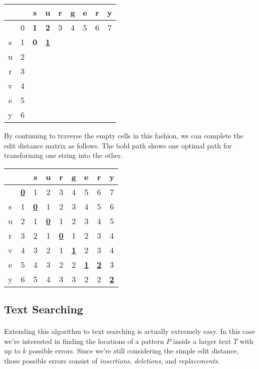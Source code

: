 \documentclass[10pt]{article}
\begin{document}
\begin{center}
\begin{tabular}{c|c|c|c|c|c|c|c|c|}
  &   & s & u & r & g & e & r & y \\ \hline
  & 0 & \textbf{1} & \textbf{2} & 3 & 4 & 5 & 6 & 7 \\ \hline
s & 1 & \textbf{0} & \textbf{\underline{1}}  &   &   &   &   &   \\ \hline
u & 2 &   &   &   &   &   &   &   \\ \hline
r & 3 &   &   &   &   &   &   &   \\ \hline
v & 4 &   &   &   &   &   &   &   \\ \hline
e & 5 &   &   &   &   &   &   &   \\ \hline
y & 6 &   &   &   &   &   &   &   \\ \hline
\end{tabular}
\end{center}

By continuing to traverse the empty cells in this fashion, we can complete the
edit distance matrix as follows. The bold path shows one optimal path for
transforming one string into the other.

\begin{center}
\begin{tabular}{c|c|c|c|c|c|c|c|c|}
  &   & s & u & r & g & e & r & y \\ \hline
  & \textbf{\underline{0}} & 1 & 2 & 3 & 4 & 5 & 6 & 7 \\ \hline
s & 1 & \textbf{\underline{0}} & 1 & 2 & 3 & 4 & 5 & 6 \\ \hline
u & 2 & 1 & \textbf{\underline{0}} & 1 & 2 & 3 & 4 & 5 \\ \hline
r & 3 & 2 & 1 & \textbf{\underline{0}} & 1 & 2 & 3 & 4 \\ \hline
v & 4 & 3 & 2 & 1 & \textbf{\underline{1}} & 2 & 3 & 4 \\ \hline
e & 5 & 4 & 3 & 2 & 2 & \textbf{\underline{1}} & \textbf{\underline{2}} & 3 \\ \hline
y & 6 & 5 & 4 & 3 & 3 & 2 & 2 & \textbf{\underline{2}} \\ \hline
\end{tabular}
\end{center}

\subsection*{Text Searching}

\paragraph{}Extending this algorithm to text searching is actually extremely
easy. In this case we're interested in finding the locations of a pattern $P$
inside a larger text $T$ with up to $k$ possible errors. Since we're still
considering the simple edit distance, those possible errors consist of
\textit{insertions}, \textit{deletions}, and \textit{replacements}.
\end{document}
